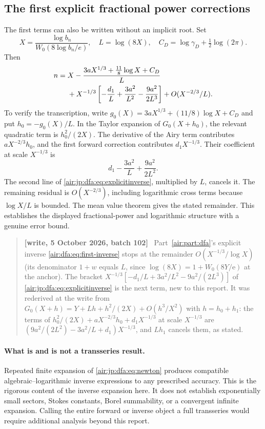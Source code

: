 \documentclass[11pt,letterpaper]{article}
\numberwithin{equation}{section}
\theoremstyle{remark}
\newcommand{\ee}{\mathrm e}
\newenvironment{writenotejp}{\par\smallskip\begin{quote}\small\textbf{[write, 5 October 2026, batch 102]}\ }{\end{quote}\smallskip}
\begin{document}
\subsection{The first explicit fractional power corrections}
The first terms can also be written without an implicit root. Set
\[
 X=\frac{\log b_n}{W_0(8\log b_n/e)},\quad L=\log(8X),\quad
 C_D=\log\gamma_D+\tfrac12\log(2\pi).
\]
Then
\begin{align}
 n={}&X-\frac{3aX^{1/3}+\frac{11}{8}\log X+C_D}{L}\notag\\
 &+X^{-1/3}\left[-\frac{d_1}{L}+\frac{3a^2}{L^2}
 -\frac{9a^2}{2L^3}\right]+O(X^{-2/3}/L).\label{air:jp:dfa:eq:explicitinverse}
\end{align}
To verify the transcription, write $g_0(X)=3aX^{1/3}+(11/8)\log X+C_D$ and put $h_0=-g_0(X)/L$. In the Taylor expansion of $G_0(X+h_0)$, the relevant quadratic term is $h_0^2/(2X)$. The derivative of the Airy term contributes $aX^{-2/3}h_0$, and the first forward correction contributes $d_1X^{-1/3}$. Their coefficient at scale $X^{-1/3}$ is
\[
 d_1-\frac{3a^2}{L}+\frac{9a^2}{2L^2}.
\]
The second line of \eqref{air:jp:dfa:eq:explicitinverse}, multiplied by $L$, cancels it. The remaining residual is $O(X^{-2/3})$, including logarithmic cross terms because $\log X/L$ is bounded. The mean value theorem gives the stated remainder. This establishes the displayed fractional-power and logarithmic structure with a genuine error bound.
\begin{writenotejp}
Part~\ref{air:part:dfa}'s explicit inverse \eqref{air:dfa:eq:first-inverse} stops at the remainder $O(X^{-1/3}/\log X)$ (its denominator $1+w$ equals $L$, since $\log(8X)=1+W_0(8Y/\ee)$ at the anchor). The bracket $X^{-1/3}[-d_1/L+3a^2/L^2-9a^2/(2L^3)]$ of \eqref{air:jp:dfa:eq:explicitinverse} is the next term, new to this report. It was rederived at the write from $G_0(X+h)=Y+Lh+h^2/(2X)+O(h^3/X^2)$ with $h=h_0+h_1$: the terms of $h_0^2/(2X)+aX^{-2/3}h_0+d_1X^{-1/3}$ at scale $X^{-1/3}$ are $(9a^2/(2L^2)-3a^2/L+d_1)X^{-1/3}$, and $Lh_1$ cancels them, as stated.
\end{writenotejp}

\paragraph{What is and is not a transseries result.}
Repeated finite expansion of \eqref{air:jp:dfa:eq:newton} produces compatible algebraic--logarithmic inverse expressions to any prescribed accuracy. This is the rigorous content of the inverse expansion here. It does not establish exponentially small sectors, Stokes constants, Borel summability, or a convergent infinite expansion. Calling the entire forward or inverse object a full transseries would require additional analysis beyond this report.
\end{document}
